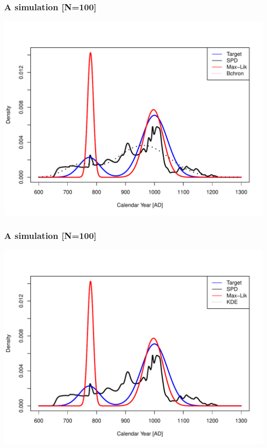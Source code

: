 \documentclass{beamer}
\begin{document}
\begin{frame}[t]
  \frametitle{A simulation [N=100]}
    \includegraphics[height=.85\textheight]{sim_target_spd_max-lik_bchron_100.pdf}
\end{frame}

\begin{frame}[t]
  \frametitle{A simulation [N=100]}
    \includegraphics[height=.85\textheight]{sim_target_spd_max-lik_kde_100.pdf}
\end{frame}
\end{document}

